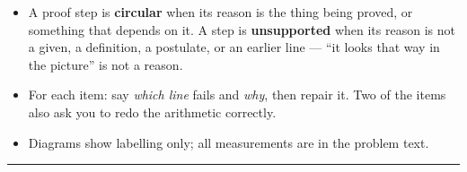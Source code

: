 \documentclass[12pt]{article}
\begin{document}

\begin{itemize}[leftmargin=0.8cm, itemsep=1pt, topsep=2pt]
  \item A proof step is \textbf{circular} when its reason is the thing being proved, or something that depends on it. A step is \textbf{unsupported} when its reason is not a given, a definition, a postulate, or an earlier line --- ``it looks that way in the picture'' is not a reason.
  \item For each item: say \emph{which line} fails and \emph{why}, then repair it. Two of the items also ask you to redo the arithmetic correctly.
  \item Diagrams show labelling only; all measurements are in the problem text.
\end{itemize}

\vspace{0.2cm}\noindent\rule{\linewidth}{0.4pt}

\end{document}
